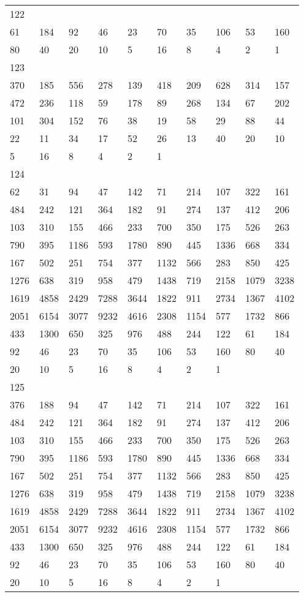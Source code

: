 \begin{longtable}{*{10}{l}}
122&&&&&&&&&\\
61& 184& 92& 46& 23& 70& 35& 106& 53& 160\\
80& 40& 20& 10& 5& 16& 8& 4& 2& 1\\

123&&&&&&&&&\\
370& 185& 556& 278& 139& 418& 209& 628& 314& 157\\
472& 236& 118& 59& 178& 89& 268& 134& 67& 202\\
101& 304& 152& 76& 38& 19& 58& 29& 88& 44\\
22& 11& 34& 17& 52& 26& 13& 40& 20& 10\\
5& 16& 8& 4& 2& 1& \\

124&&&&&&&&&\\
62& 31& 94& 47& 142& 71& 214& 107& 322& 161\\
484& 242& 121& 364& 182& 91& 274& 137& 412& 206\\
103& 310& 155& 466& 233& 700& 350& 175& 526& 263\\
790& 395& 1186& 593& 1780& 890& 445& 1336& 668& 334\\
167& 502& 251& 754& 377& 1132& 566& 283& 850& 425\\
1276& 638& 319& 958& 479& 1438& 719& 2158& 1079& 3238\\
1619& 4858& 2429& 7288& 3644& 1822& 911& 2734& 1367& 4102\\
2051& 6154& 3077& 9232& 4616& 2308& 1154& 577& 1732& 866\\
433& 1300& 650& 325& 976& 488& 244& 122& 61& 184\\
92& 46& 23& 70& 35& 106& 53& 160& 80& 40\\
20& 10& 5& 16& 8& 4& 2& 1& \\

125&&&&&&&&&\\
376& 188& 94& 47& 142& 71& 214& 107& 322& 161\\
484& 242& 121& 364& 182& 91& 274& 137& 412& 206\\
103& 310& 155& 466& 233& 700& 350& 175& 526& 263\\
790& 395& 1186& 593& 1780& 890& 445& 1336& 668& 334\\
167& 502& 251& 754& 377& 1132& 566& 283& 850& 425\\
1276& 638& 319& 958& 479& 1438& 719& 2158& 1079& 3238\\
1619& 4858& 2429& 7288& 3644& 1822& 911& 2734& 1367& 4102\\
2051& 6154& 3077& 9232& 4616& 2308& 1154& 577& 1732& 866\\
433& 1300& 650& 325& 976& 488& 244& 122& 61& 184\\
92& 46& 23& 70& 35& 106& 53& 160& 80& 40\\
20& 10& 5& 16& 8& 4& 2& 1& \\


\end{longtable}
